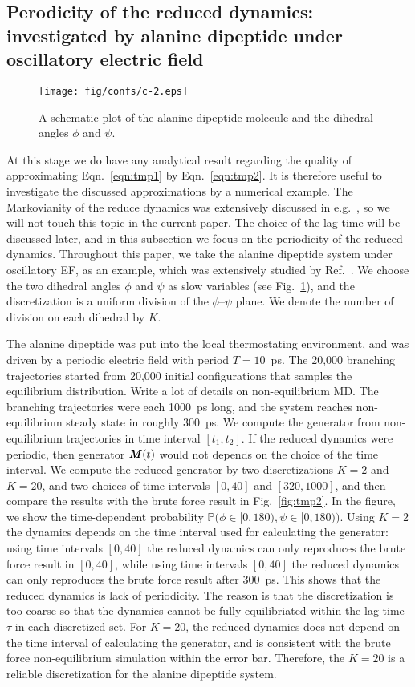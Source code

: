 \documentclass[aps, pre, preprint,unsortedaddress,a4paper,onecolumn]{revtex4}
\newcommand{\redc}[1]{{\color{red} #1}}
\newcommand{\vect}[1]{\textbf{\textit{#1}}}
\begin{document}
\subsection{Perodicity of the reduced dynamics: investigated by alanine dipeptide under oscillatory electric field}
\begin{figure}
  \centering
  \texttt{[image: fig/confs/c-2.eps]}
  \caption{A schematic plot of the alanine dipeptide molecule and the dihedral angles $\phi$ and $\psi$.}
  \label{fig:tmp1}
\end{figure}

At this stage we do have any analytical result regarding the quality
of approximating Eqn.~\eqref{eqn:tmp1} by
Eqn.~\eqref{eqn:tmp2}.
It is therefore useful to investigate the discussed approximations
by a numerical example. The Markovianity of the reduce dynamics
was extensively discussed in e.g.~\cite{prinz2011markov}, so we 
will not touch this topic in the current paper. The choice of the lag-time
will be discussed later, and in this subsection we focus on the periodicity
of the reduced dynamics.
Throughout this paper, we take the alanine dipeptide system
under oscillatory EF, as an example, which was extensively studied by
Ref.~\cite{wang2014exploring}.
We choose the two dihedral angles $\phi$
and $\psi$ as slow variables (see Fig.~\ref{fig:tmp1}), and the discretization
is a uniform division of the $\phi$--$\psi$ plane. We denote the number of
division on each dihedral by $K$.

The alanine dipeptide was put into the local thermostating
environment, and was driven by a periodic electric field with period
$T = 10$~ps. The 20,000 branching trajectories started from 20,000
initial configurations that samples the equilibrium distribution.
\redc{Write a lot of details on non-equilibrium MD.}  The branching
trajectories were each 1000~ps long, and the system reaches
non-equilibrium steady state in roughly 300~ps. We compute the
generator from non-equilibrium trajectories in time interval $[t_1,
t_2]$. If the reduced dynamics were periodic, then generator $\vect
M(t)$ would not depends on the choice of the time interval. We compute
the reduced generator by two discretizations $K=2$ and $K=20$, and two
choices of time intervals $[0, 40]$ and $[320, 1000]$, and then
compare the results with the brute force result in
Fig.~\ref{fig:tmp2}. In the figure, we show the time-dependent
probability $\mathbb P\big(\phi\in[0,180), \psi\in [0,180)\big)$.
Using $K=2$ the dynamics depends on the time interval used for
calculating the generator: using time intervals $[0, 40]$ the reduced
dynamics can only reproduces the brute force result in $[0, 40]$,
while using time intervals $[0, 40]$ the reduced dynamics can only
reproduces the brute force result after 300~ps.  This shows that the
reduced dynamics is lack of periodicity.  The reason is that the
discretization is too coarse so that the dynamics cannot be fully
equilibriated within the lag-time $\tau$ in each discretized set.  For
$K=20$, the reduced dynamics does not depend on the time interval of
calculating the generator, and is consistent with the brute force
non-equilibrium simulation within the error bar. Therefore, the $K=20$
is a reliable discretization for the alanine dipeptide system.
\end{document}
